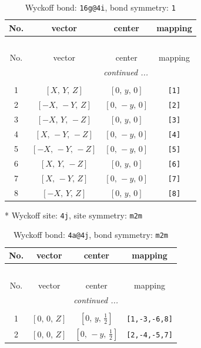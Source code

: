 \documentclass[fleqn,8pt]{jsarticle}
\begin{document}
\begin{longtable}{cccc}
\caption{Wyckoff bond: {\tt 16g@4i}, bond symmetry: {\tt 1}}
 \\
 \hline \hline
No. & vector & center & mapping \\ \hline \endfirsthead

\multicolumn{3}{l}{\tablename\ \thetable{}} \\
 \hline \hline
No. & vector & center & mapping \\ \hline \endhead

 \hline \hline
\multicolumn{3}{r}{\footnotesize\it continued ...} \\ \endfoot

 \hline \hline
\multicolumn{3}{r}{} \\ \endlastfoot

1 & $\left[ X,\, Y,\, Z \right]$ & $\left[ 0,\, y,\, 0 \right]$ & {\tt [1]} \\ \hline
2 & $\left[ - X,\, - Y,\, Z \right]$ & $\left[ 0,\, - y,\, 0 \right]$ & {\tt [2]} \\ \hline
3 & $\left[ - X,\, Y,\, - Z \right]$ & $\left[ 0,\, y,\, 0 \right]$ & {\tt [3]} \\ \hline
4 & $\left[ X,\, - Y,\, - Z \right]$ & $\left[ 0,\, - y,\, 0 \right]$ & {\tt [4]} \\ \hline
5 & $\left[ - X,\, - Y,\, - Z \right]$ & $\left[ 0,\, - y,\, 0 \right]$ & {\tt [5]} \\ \hline
6 & $\left[ X,\, Y,\, - Z \right]$ & $\left[ 0,\, y,\, 0 \right]$ & {\tt [6]} \\ \hline
7 & $\left[ X,\, - Y,\, Z \right]$ & $\left[ 0,\, - y,\, 0 \right]$ & {\tt [7]} \\ \hline
8 & $\left[ - X,\, Y,\, Z \right]$ & $\left[ 0,\, y,\, 0 \right]$ & {\tt [8]} \\
\end{longtable}
* Wyckoff site: {\tt 4j}, site symmetry: {\tt m2m}
\renewcommand{\arraystretch}{1.2}
\begin{longtable}{cccc}
\caption{Wyckoff bond: {\tt 4a@4j}, bond symmetry: {\tt m2m}}
 \\
 \hline \hline
No. & vector & center & mapping \\ \hline \endfirsthead

\multicolumn{3}{l}{\tablename\ \thetable{}} \\
 \hline \hline
No. & vector & center & mapping \\ \hline \endhead

 \hline \hline
\multicolumn{3}{r}{\footnotesize\it continued ...} \\ \endfoot

 \hline \hline
\multicolumn{3}{r}{} \\ \endlastfoot

1 & $\left[ 0,\, 0,\, Z \right]$ & $\left[ 0,\, y,\, \frac{1}{2} \right]$ & {\tt [1,-3,-6,8]} \\ \hline
2 & $\left[ 0,\, 0,\, Z \right]$ & $\left[ 0,\, - y,\, \frac{1}{2} \right]$ & {\tt [2,-4,-5,7]} \\
\end{longtable}
\end{document}
